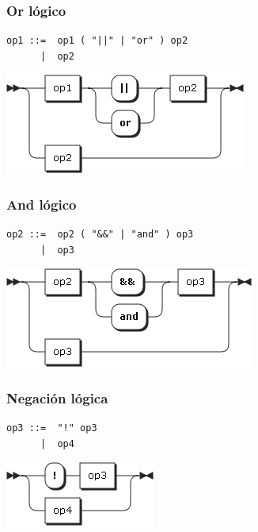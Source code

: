 \subsubsection{Or lógico}
\begin{multicols}{2}
\begin{lstlisting}[style=nonumbers]      
op1 ::=  op1 ( "||" | "or" ) op2
      |  op2
\end{lstlisting}  
\columnbreak	
\begin{center}
\includegraphics[scale=0.6]{diagram/lop1.png} \\
\end{center}
\end{multicols}

\subsubsection{And lógico}
\begin{multicols}{2}
\begin{lstlisting}[style=nonumbers]      
op2 ::=  op2 ( "&&" | "and" ) op3
      |  op3
\end{lstlisting}  
\columnbreak	
\begin{center}
\includegraphics[scale=0.6]{diagram/op2.png} \\
\end{center}
\end{multicols}

\subsubsection{Negación lógica}
\begin{multicols}{2}
\begin{lstlisting}[style=nonumbers]      
op3 ::=  "!" op3 
      |  op4
\end{lstlisting}  
\columnbreak	
\begin{center}
\includegraphics[scale=0.6]{diagram/op3.png} \\
\end{center}
\end{multicols}

